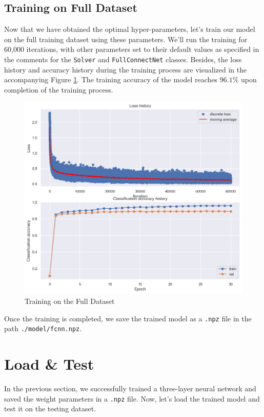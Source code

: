 \documentclass[10pt,a4paper,twoside]{tau}
\begin{document}
\subsection{Training on Full Dataset}

Now that we have obtained the optimal hyper-parameters, let's train our model on the full training dataset using these parameters. We'll run the training for 60,000 iterations, with other parameters set to their default values as specified in the comments for the \texttt{Solver} and \texttt{FullConnectNet} classes. Besides, the loss history and accuracy history during the training process are visualized in the accompanying Figure \ref{fig:full-train}. The training accuracy of the model reaches $96.1\%$ upon completion of the training process.

\begin{figure}[htbp]
    \centering
    \includegraphics[scale=0.35]{images/full_train.png}
    \caption{Training on the Full Dataset}
    \label{fig:full-train}
\end{figure}

Once the training is completed, we save the trained model as a \texttt{.npz} file in the path \texttt{./model/fcnn.npz}.


\section{Load \& Test}

In the previous section, we successfully trained a three-layer neural network and saved the weight parameters in a \texttt{.npz} file. Now, let's load the trained model and test it on the testing dataset.
\end{document}
